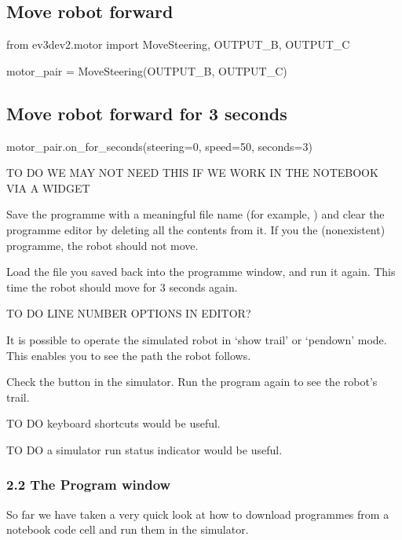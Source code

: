 \documentclass[letterpaper,10pt,english]{sphinxmanual}
\begin{document}
\subsection{Move robot forward}
\label{\detokenize{content/00_SOFTWARE_GUIDE/Section_00_02-nb3devsim:Move-robot-forward}}
from ev3dev2.motor import MoveSteering, OUTPUT\_B, OUTPUT\_C

motor\_pair = MoveSteering(OUTPUT\_B, OUTPUT\_C)


\subsection{Move robot forward for 3 seconds}
\label{\detokenize{content/00_SOFTWARE_GUIDE/Section_00_02-nb3devsim:Move-robot-forward-for-3-seconds}}
motor\_pair.on\_for\_seconds(steering=0, speed=50, seconds=3)



TO DO \sphinxhyphen{} WE MAY NOT NEED THIS IF WE WORK IN THE NOTEBOOK VIA A WIDGET

Save the programme with a meaningful file name (for example, ) and clear the programme editor by deleting all the contents from it. If you  the (non\sphinxhyphen{}existent) programme, the robot should not move.

Load the file you saved back into the programme window, and run it again. This time the robot should move for 3 seconds again.

TO DO \sphinxhyphen{} LINE NUMBER OPTIONS IN EDITOR?

It is possible to operate the simulated robot in ‘show trail’ or ‘pen\sphinxhyphen{}down’ mode. This enables you to see the path the robot follows.

Check the  button in the simulator. Run the program again to see the robot’s trail.

TO DO \sphinxhyphen{} keyboard shortcuts would be useful.

TO DO \sphinxhyphen{} a simulator run status indicator would be useful.


\subsubsection{2.2 The Program window}
\label{\detokenize{content/00_SOFTWARE_GUIDE/Section_00_02-nb3devsim:2.2-The-Program-window}}
So far we have taken a very quick look at how to download programmes from a notebook code cell and run them in the simulator.
\end{document}

